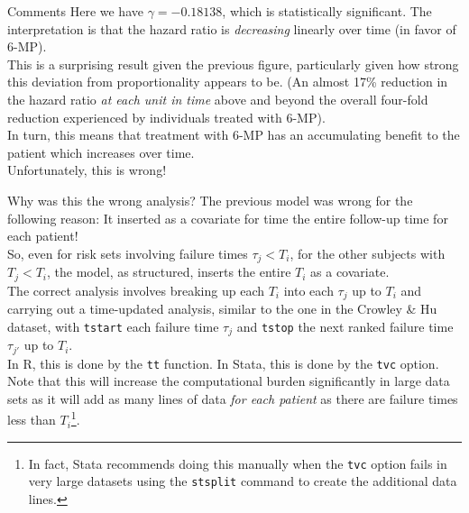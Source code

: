 \documentclass[envcountsect, 10pt, portrait, palatino]{beamer}
\begin{document}
\begin{frame}{Comments}
Here we have $\gamma=-0.18138$, which is statistically significant.  The interpretation is that the hazard ratio is \textit{decreasing} linearly over time (in favor of 6-MP).\\[2ex]
This is a surprising result given the previous figure, particularly given how strong this deviation from proportionality appears to be. (An almost 17\% reduction in the hazard ratio \textit{at each unit in time} above and beyond the overall four-fold reduction experienced by individuals treated with 6-MP).\\[2ex]
In turn, this means that treatment with 6-MP has an accumulating benefit to the patient which increases over time.\\[2ex]
Unfortunately, this is wrong!
\end{frame}
\begin{frame}{Why was this the wrong analysis?}
The previous model was wrong for the following reason:  It inserted as a covariate for time the entire follow-up time for each patient!\\[2ex]
So, even for risk sets involving failure times $\tau_j<T_i$, for the other subjects with $T_j<T_i$, the model, as structured, inserts the entire $T_i$ as a covariate.\\[2ex]
The correct analysis involves breaking up each $T_i$ into each $\tau_j$ up to $T_i$ and carrying out a time-updated analysis, similar to the one in the Crowley \& Hu dataset, with {\tt tstart} each failure time $\tau_j$ and {\tt tstop} the next ranked failure time $\tau_{j'}$ up to $T_i$. \\[2ex]
In R, this is done by the {\tt tt} function. In Stata, this is done by the {\tt tvc} option.
\\[2ex]
Note that this will increase the computational burden significantly in large data sets as it will add as many lines of data \textit{for each patient} as there are failure times less than $T_i$\footnote{In fact, Stata recommends doing this manually when the {\tt tvc} option fails in very large datasets using the {\tt stsplit} command to create the additional data lines.}.
\end{frame}
\end{document}
